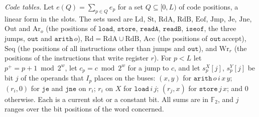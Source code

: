 \documentclass[11pt,letterpaper]{article}
\theoremstyle{definition}
\theoremstyle{remark}
\begin{document}
\emph{Code tables.} Let \(e(Q)=\sum_{p\in Q}e_p\) for a set
\(Q\subseteq[0,L)\) of code positions, a linear form in the slots. The
sets used are \(\mathrm{Ld}\), \(\mathrm{St}\), \(\mathrm{RdA}\),
\(\mathrm{RdB}\), \(\mathrm{Eof}\), \(\mathrm{Jmp}\), \(\mathrm{Je}\),
\(\mathrm{Jne}\), \(\mathrm{Out}\) and \(\mathrm{Ar}_o\) (the positions of
\(\mathtt{load}\), \(\mathtt{store}\), \(\mathtt{readA}\),
\(\mathtt{readB}\), \(\mathtt{iseof}\), the three jumps, \(\mathtt{out}\)
and \(\mathtt{arith}\,o\)), \(\mathrm{Rd}=\mathrm{RdA}\cup\mathrm{RdB}\),
\(\mathrm{Acc}\) (the positions of \(\mathtt{out}\,\mathrm{accept}\)),
\(\mathrm{Seq}\) (the positions of all instructions other than jumps and
\(\mathtt{out}\)), and \(\mathrm{Wr}_r\) (the positions of the
instructions that write register \(r\)). For \(p<L\) let
\(p^+=p+1\bmod2^w\), let \(c_p=c\bmod2^w\) for a jump to \(c\), and let
\(s^X_p[j]\), \(s^Y_p[j]\) be bit \(j\) of the operands that \(I_p\)
places on the buses: \((x,y)\) for \(\mathtt{arith}\,o\,i\,x\,y\);
\((r_i,0)\) for \(\mathtt{je}\) and \(\mathtt{jne}\) on \(r_i\); \(r_i\)
on \(X\) for \(\mathtt{load}\,i\,j\); \((r_j,x)\) for
\(\mathtt{store}\,j\,x\); and \(0\) otherwise. Each is a current slot or
a constant bit. All sums are in \(\mathbb F_2\), and \(j\) ranges over
the bit positions of the word concerned.
\end{document}
